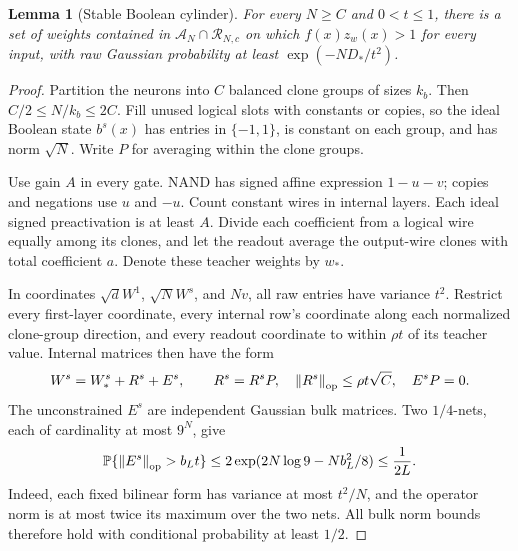 \documentclass[11pt]{article}
\newtheorem{lemma}[theorem]{Lemma}
\newcommand{\Prb}{\mathbb P}
\newcommand{\norm}[1]{\left\|#1\right\|}
\begin{document}
\begin{lemma}[Stable Boolean cylinder]\label{lem:cylinder}
For every $N\ge C$ and $0<t\le1$, there is a set of weights contained in
$\mathcal A_N\cap\mathcal R_{N,c}$ on which $f(x)z_w(x)>1$ for every
input, with raw Gaussian probability at least $\exp(-ND_*/t^2)$.
\end{lemma}
\begin{proof}
Partition the neurons into $C$ balanced clone groups of sizes $k_b$.
Then $C/2\le N/k_b\le2C$. Fill unused logical slots with constants or
copies, so the ideal Boolean state $b^s(x)$ has entries in $\{-1,1\}$,
is constant on each group, and has norm $\sqrt N$. Write $P$ for averaging
within the clone groups.

Use gain $A$ in every gate. NAND has signed affine expression $1-u-v$;
copies and negations use $u$ and $-u$. Count constant wires in internal
layers. Each ideal signed preactivation is at least $A$. Divide each
coefficient from a logical wire equally among its clones, and let the
readout average the output-wire clones with total coefficient $a$.
Denote these teacher weights by $w_*$.

In coordinates $\sqrt d W^1$, $\sqrt N W^s$, and $Nv$, all raw entries
have variance $t^2$. Restrict every first-layer coordinate, every internal
row's coordinate along each normalized clone-group direction, and every
readout coordinate to within $\rho t$ of its teacher value. Internal
matrices then have the form
\[
 W^s=W_*^s+R^s+E^s,\qquad
 R^s=R^sP,\quad \norm{R^s}_{\rm op}\le\rho t\sqrt C,
 \quad E^sP=0.
\]
The unconstrained $E^s$ are independent Gaussian bulk matrices. Two
$1/4$-nets, each of cardinality at most $9^N$, give
\[
 \Prb\{\norm{E^s}_{\rm op}>b_Lt\}
 \le2\exp(2N\log9-Nb_L^2/8)\le\frac1{2L}.
\]
Indeed, each fixed bilinear form has variance at most $t^2/N$, and the
operator norm is at most twice its maximum over the two nets.
All bulk norm bounds therefore hold with conditional probability at least
$1/2$.


\end{proof}
\end{document}
